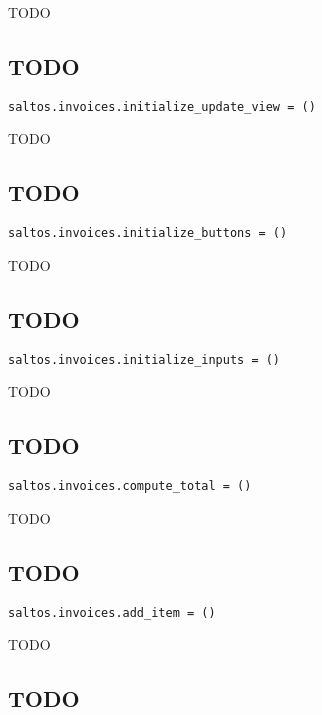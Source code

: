 \documentclass[a4paper]{book}
\begin{document}
TODO

\hypertarget{toc76}{}
\subsection{TODO}

\begin{lstlisting}
saltos.invoices.initialize_update_view = ()
\end{lstlisting}

TODO

\hypertarget{toc77}{}
\subsection{TODO}

\begin{lstlisting}
saltos.invoices.initialize_buttons = ()
\end{lstlisting}

TODO

\hypertarget{toc78}{}
\subsection{TODO}

\begin{lstlisting}
saltos.invoices.initialize_inputs = ()
\end{lstlisting}

TODO

\hypertarget{toc79}{}
\subsection{TODO}

\begin{lstlisting}
saltos.invoices.compute_total = ()
\end{lstlisting}

TODO

\hypertarget{toc80}{}
\subsection{TODO}

\begin{lstlisting}
saltos.invoices.add_item = ()
\end{lstlisting}

TODO

\hypertarget{toc81}{}
\subsection{TODO}
\end{document}
